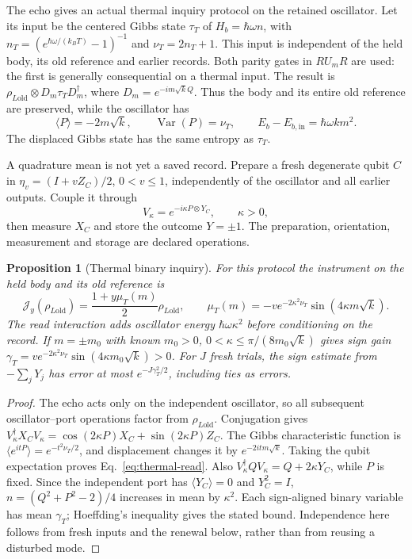\documentclass[aps,pre,onecolumn,superscriptaddress,floatfix,longbibliography]{revtex4-2}
\newtheorem{proposition}[theorem]{Proposition}
\begin{document}
The echo gives an actual thermal inquiry protocol on the retained oscillator.
Let its input be the centered Gibbs state $\tau_T$ of
$H_b=\hbar\omega n$, with $n_T=(e^{\hbar\omega/(k_BT)}-1)^{-1}$ and
$\nu_T=2n_T+1$. This input is independent of the held body, its old reference
and earlier records. Both parity gates in $R U_m R$ are used: the first is
generally consequential on a thermal input. The result is
$\rho_{L\mathrm{old}}\otimes D_m\tau_TD_m^\dagger$, where
$D_m=e^{-im\sqrt{k}Q}$. Thus the body and its entire old reference are
preserved, while the oscillator has
\[
 \langle P\rangle=-2m\sqrt{k},\qquad
 \operatorname{Var}(P)=\nu_T,\qquad
 E_b-E_{b,\mathrm{in}}=\hbar\omega km^2.
\]
The displaced Gibbs state has the same entropy as $\tau_T$.

A quadrature mean is not yet a saved record. Prepare a fresh degenerate
qubit $C$ in $\eta_v=(I+vZ_C)/2$, $0<v\le1$, independently of the
oscillator and all earlier outputs. Couple it through
\[
 V_\kappa=e^{-i\kappa P\otimes Y_C},\qquad \kappa>0,
\]
then measure $X_C$ and store the outcome $Y=\pm1$. The preparation,
orientation, measurement and storage are declared operations.

\begin{proposition}[Thermal binary inquiry]\label{prop:thermal-read}
For this protocol the instrument on the held body and its old reference is
\begin{equation}\label{eq:thermal-read}
 \mathcal J_y(\rho_{L\mathrm{old}})
 =\frac{1+y\mu_T(m)}2\rho_{L\mathrm{old}},\qquad
 \mu_T(m)=-v e^{-2\kappa^2\nu_T}\sin(4\kappa m\sqrt{k}).
\end{equation}
The read interaction adds oscillator energy $\hbar\omega\kappa^2$
before conditioning on the record. If $m=\pm m_0$ with known $m_0>0$,
$0<\kappa\le\pi/(8m_0\sqrt{k})$ gives sign gain
$\gamma_T=v e^{-2\kappa^2\nu_T}\sin(4\kappa m_0\sqrt{k})>0$.
For $J$ fresh trials, the sign estimate from $-\sum_jY_j$ has error at most
$e^{-J\gamma_T^2/2}$, including ties as errors.
\end{proposition}
\begin{proof}
The echo acts only on the independent oscillator, so all subsequent
oscillator--port operations factor from $\rho_{L\mathrm{old}}$.
Conjugation gives
$V_\kappa^\dagger X_CV_\kappa
=\cos(2\kappa P)X_C+\sin(2\kappa P)Z_C$.
The Gibbs characteristic function is
$\langle e^{itP}\rangle=e^{-t^2\nu_T/2}$, and displacement changes it by
$e^{-2itm\sqrt{k}}$. Taking the qubit expectation proves
Eq.~\eqref{eq:thermal-read}. Also
$V_\kappa^\dagger QV_\kappa=Q+2\kappa Y_C$, while $P$ is fixed.
Since the independent port has $\langle Y_C\rangle=0$ and $Y_C^2=I$,
$n=(Q^2+P^2-2)/4$ increases in mean by $\kappa^2$.
Each sign-aligned binary variable has mean $\gamma_T$; Hoeffding's
inequality gives the stated bound. Independence here follows from fresh
inputs and the renewal below, rather than from reusing a disturbed mode.
\end{proof}
\end{document}
